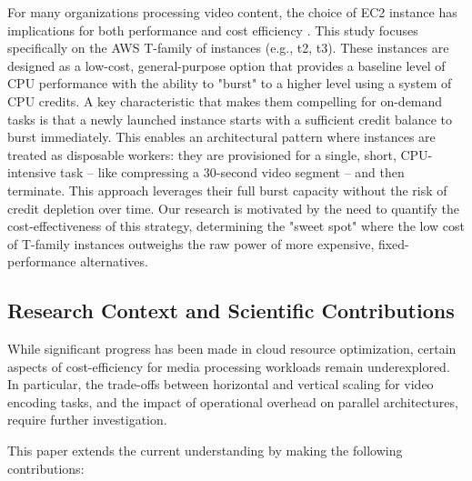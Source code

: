 \documentclass[conference]{IEEEtran}
\begin{document}
	For many organizations processing video content, the choice of EC2 instance has implications for both performance and cost efficiency \cite{p__praveenchandar_6ddf409a, tamara_dancheva_635e0512}. This study focuses specifically on the AWS T-family of instances (e.g., t2, t3). These instances are designed as a low-cost, general-purpose option that provides a baseline level of CPU performance with the ability to "burst" to a higher level using a system of CPU credits. A key characteristic that makes them compelling for on-demand tasks is that a newly launched instance starts with a sufficient credit balance to burst immediately. This enables an architectural pattern where instances are treated as disposable workers: they are provisioned for a single, short, CPU-intensive task -- like compressing a 30-second video segment -- and then terminate. This approach leverages their full burst capacity without the risk of credit depletion over time. Our research is motivated by the need to quantify the cost-effectiveness of this strategy, determining the "sweet spot" where the low cost of T-family instances outweighs the raw power of more expensive, fixed-performance alternatives.
	
	\subsection{Research Context and Scientific Contributions}
	
	While significant progress has been made in cloud resource optimization, certain aspects of cost-efficiency for media processing workloads remain underexplored. In particular, the trade-offs between horizontal and vertical scaling for video encoding tasks, and the impact of operational overhead on parallel architectures, require further investigation.
	
	This paper extends the current understanding by making the following contributions:
	
\end{document}
